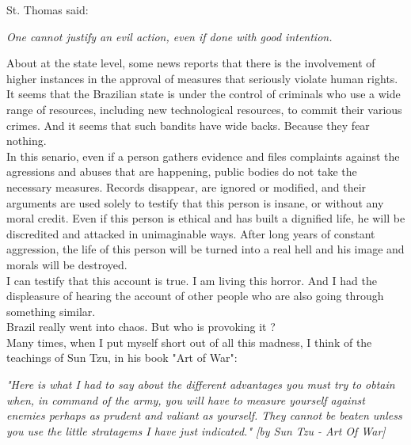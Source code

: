 \documentclass[11pt]{book}
\begin{document}
\noindent St. Thomas said:

\noindent \begin{center} \emph{One cannot justify an evil action, even if done with good intention.} \end{center}

\noindent About at the state level, some news reports that there is the involvement of higher instances in the approval of measures that seriously violate human rights.  \\

\noindent It seems that the Brazilian state is under the control of criminals who use a wide range of resources, including new technological resources, to commit their various crimes. And it seems that such bandits have wide backs. Because they fear nothing. \\

\noindent In this senario, even if a person gathers evidence and files complaints against the agressions and abuses that are happening, public bodies do not take the necessary measures. Records disappear, are ignored or modified, and their arguments are used solely to testify that this person is insane, or without any moral credit. Even if this person is ethical and has built a dignified life, he will be discredited and attacked in unimaginable ways. After long years of constant aggression, the life of this person will be turned into a real hell and his image and morals will be destroyed.  \\

\noindent I can testify that this account is true. I am living this horror. And I had the displeasure of hearing the account of other people who are also going through something similar. \\

\noindent Brazil really went into chaos. But who is provoking it ? \\

\noindent Many times, when I put myself short out of all this madness, I think of the teachings of Sun Tzu, in his book "Art of War":

\noindent \begin{center} \emph{"Here is what I had to say about the different advantages you must try to obtain when, in command of the army, you will have to measure yourself against enemies perhaps as prudent and valiant as yourself. They cannot be beaten unless you use the little stratagems I have just indicated."
[by Sun Tzu - Art Of War]} \end{center}
\end{document}
